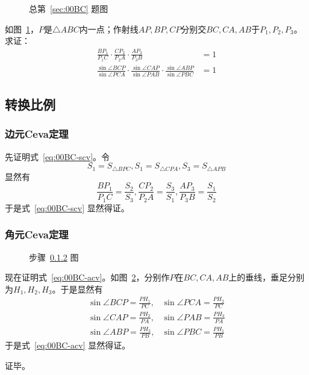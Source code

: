 

\begin{figure}[htbp]
    \centering {}
    \caption{总第~\ref{sec:00BC} 题图}
    \label{fig:00BC}
\end{figure}

如图~\ref{fig:00BC}，$P$是$\triangle ABC$内一点；作射线$AP, BP, CP$分别交$BC, CA, AB$于$P_1, P_2, P_3$。求证：
\begin{align}
  \frac{BP_1}{P_1C}\cdot\frac{CP_2}{P_2A}\cdot\frac{AP_3}{P_3B} &= 1 \label{eq:00BC-scv} \\
  \frac{\sin\angle BCP}{\sin\angle PCA}\cdot\frac{\sin\angle CAP}{\sin\angle PAB}\cdot\frac{\sin\angle ABP}{\sin\angle PBC} &= 1 \label{eq:00BC-acv}
\end{align}

\subsection{转换比例}

\subsubsection{边元Ceva定理}

先证明式~\ref{eq:00BC-scv}。令
\[ S_1 = S_{\triangle BPC}, S_1 = S_{\triangle CPA}, S_3 = S_{\triangle APB} \]
显然有
\[ \frac{BP_1}{P_1C} = \frac{S_2}{S_3}, \frac{CP_2}{P_2A} = \frac{S_3}{S_1}, \frac{AP_3}{P_3B} = \frac{S_1}{S_2} \]
于是式~\ref{eq:00BC-scv} 显然得证。

\subsubsection{角元Ceva定理} \label{subsubsec:00BC-acv}

\begin{figure}[htbp]
  \centering {}
  \caption{步骤~\ref{subsubsec:00BC-acv} 图}
  \label{fig:00BC-acv}
\end{figure}

现在证明式~\ref{eq:00BC-acv}。如图~\ref{fig:00BC-acv}，分别作$P$在$BC, CA, AB$上的垂线，垂足分别为$H_1, H_2, H_3$。于是显然有
\begin{align*}
  \sin\angle BCP = \frac{PH_1}{PC}, & \sin\angle PCA = \frac{PH_2}{PC} \\
  \sin\angle CAP = \frac{PH_2}{PA}, & \sin\angle PAB = \frac{PH_3}{PA} \\
  \sin\angle ABP = \frac{PH_3}{PB}, & \sin\angle PBC = \frac{PH_1}{PB}
\end{align*}
于是式~\ref{eq:00BC-acv} 显然得证。

证毕。
